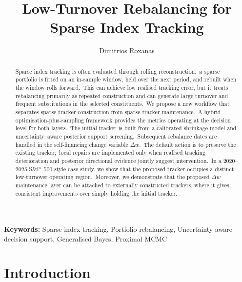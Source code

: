 \documentclass[11pt]{article}
\title{Low-Turnover Rebalancing for Sparse Index Tracking}
\author[]{Dimitrios Roxanas}
\affil[]{School of Mathematical and Physical Sciences,\\
The University of Sheffield, S3 7RH, United Kingdom.\\
Email: d.roxanas@sheffield.ac.uk}
\date{}
\begin{document}
\maketitle
\begin{abstract}

Sparse index tracking is often evaluated through rolling reconstruction:\ a sparse portfolio is fitted on an in-sample window, held over the next period, and rebuilt when the window rolls forward.\ This can achieve low realised tracking error, but it treats rebalancing primarily as repeated construction and can generate large turnover and frequent substitutions in the selected constituents.\ We propose a new workflow that separates sparse-tracker construction from sparse-tracker maintenance.\ A hybrid optimisation-plus-sampling framework provides the metrics operating at the decision level for both layers.\ The initial tracker is built from a calibrated shrinkage model and uncertainty--aware posterior support screening.\ Subsequent rebalance dates are handled in the self-financing change variable $\Delta w$.\ The default action is to preserve the existing tracker;\ local repairs are implemented only when realised tracking deterioration and posterior directional evidence jointly suggest intervention.\ In a 2020--2025 S\&P~500-style case study, we show that the proposed tracker occupies a distinct low-turnover operating region.\ Moreover, we demonstrate that the proposed $\Delta w$ maintenance layer can be attached to externally constructed trackers, where it gives consistent improvements over simply holding the initial tracker.
\end{abstract}

{\bf Keywords:} Sparse index tracking, Portfolio rebalancing, Uncertainty-aware decision support, Generalised Bayes, Proximal MCMC



\tableofcontents



\section{Introduction}
\end{document}
